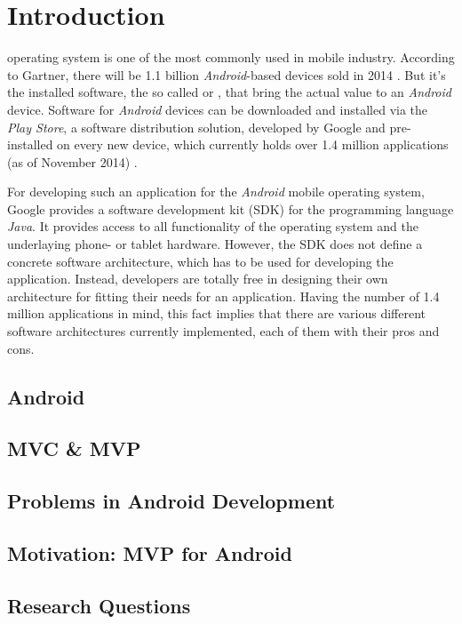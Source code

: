 \section{Introduction}

 operating system is one of the most 
commonly used in mobile industry. According to Gartner, there will be 1.1 
billion \emph{Android}-based devices sold in 2014 \cite{GartnerAndroid2014}.
But it's the installed software, the so called  or 
, that bring the actual value to an \emph{Android} device.
Software for \emph{Android} devices can be downloaded and installed via the 
\emph{Play Store}, a software distribution solution, developed by Google and 
pre-installed on every new device, which currently holds over 1.4 million 
applications (as of November 2014) \cite{AppBrainStats}.

For developing such an application for the \emph{Android} mobile operating 
system, Google provides a software development kit (SDK) for the programming 
language \emph{Java}. It provides access to all functionality of the 
operating system and the underlaying phone- or tablet hardware.
However, the SDK does not define a concrete software architecture, which has to 
be used for developing the application. Instead, developers are totally free in 
designing their own architecture for fitting their needs for an application.
Having the number of 1.4 million applications in mind, this fact implies that 
there are various different software architectures currently implemented, each 
of them with their pros and cons.


	\subsection{Android}
	
	\subsection{MVC \& MVP}
	
	\subsection{Problems in Android Development}
	
	\subsection{Motivation: MVP for Android}
	
	\subsection{Research Questions}
	

	
	